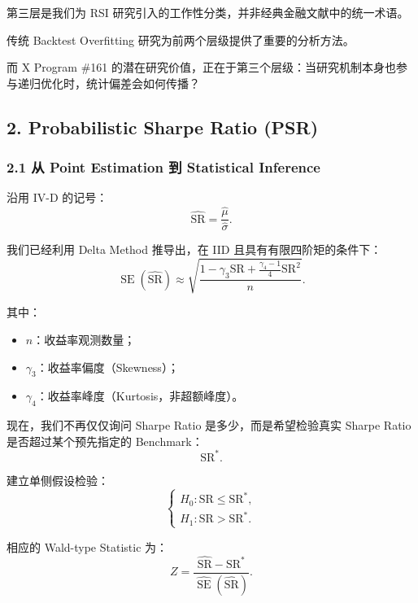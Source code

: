 第三层是我们为 RSI 研究引入的工作性分类，并非经典金融文献中的统一术语。


传统 Backtest Overfitting 研究为前两个层级提供了重要的分析方法。

而 X Program \#161 的潜在研究价值，正在于第三个层级：当研究机制本身也参与递归优化时，统计偏差会如何传播？

\hypertarget{part-4-71-0001-probabilistic-sharpe-ratio-psr}{%
\subsection{2. Probabilistic Sharpe Ratio (PSR)}\label{part-4-71-0001-probabilistic-sharpe-ratio-psr}}

\hypertarget{part-4-71-0001-ux4ece-point-estimation-ux5230-statistical-inference}{%
\subsubsection{2.1 从 Point Estimation 到 Statistical Inference}\label{part-4-71-0001-ux4ece-point-estimation-ux5230-statistical-inference}}

沿用 IV-D 的记号：
\[\widehat{\mathrm{SR}}
=
\frac{\hat\mu}{\hat\sigma}.\]

我们已经利用 Delta Method 推导出，在 IID 且具有有限四阶矩的条件下：
\[\operatorname{SE}(\widehat{\mathrm{SR}})
\approx
\sqrt{
\frac{
1-\gamma_3\mathrm{SR}
+\frac{\gamma_4-1}{4}\mathrm{SR}^2
}{n}
}.\]

其中：

\begin{itemize}
\tightlist
\item
  \(n\)：收益率观测数量；
\item
  \(\gamma_3\)：收益率偏度（Skewness）；
\item
  \(\gamma_4\)：收益率峰度（Kurtosis，非超额峰度）。
\end{itemize}

现在，我们不再仅仅询问 Sharpe Ratio 是多少，而是希望检验真实 Sharpe Ratio 是否超过某个预先指定的 Benchmark：
\[\mathrm{SR}^*.\]

建立单侧假设检验：
\[\begin{cases}
H_0:\mathrm{SR}\leq\mathrm{SR}^*,\\
H_1:\mathrm{SR}>\mathrm{SR}^*.
\end{cases}\]

相应的 Wald-type Statistic 为：
\[Z=
\frac{
\widehat{\mathrm{SR}}-\mathrm{SR}^*
}{
\widehat{\operatorname{SE}}(\widehat{\mathrm{SR}})
}.\]

